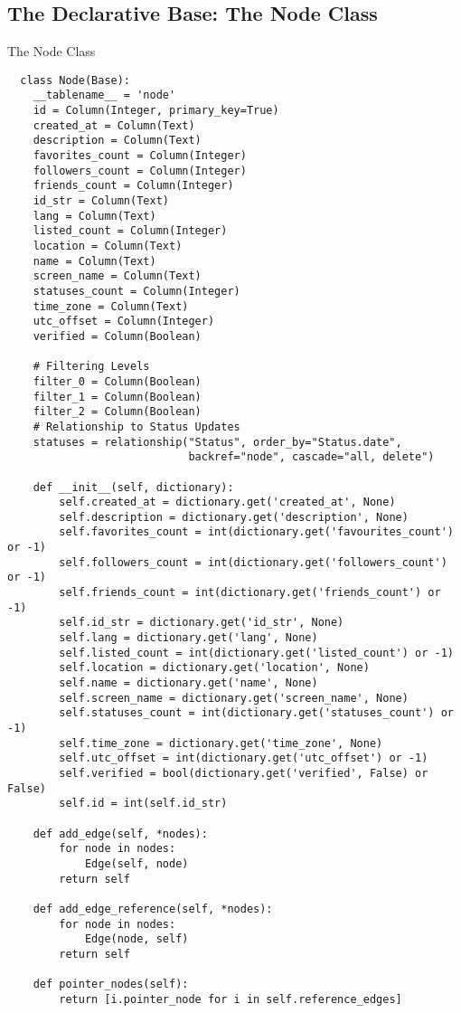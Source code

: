 \subsection{The Declarative Base: The Node Class}
The Node Class
\begin{lstlisting}
  class Node(Base):
    __tablename__ = 'node'
    id = Column(Integer, primary_key=True)
    created_at = Column(Text)
    description = Column(Text)
    favorites_count = Column(Integer)
    followers_count = Column(Integer)
    friends_count = Column(Integer)
    id_str = Column(Text)
    lang = Column(Text)
    listed_count = Column(Integer)
    location = Column(Text)
    name = Column(Text)
    screen_name = Column(Text)
    statuses_count = Column(Integer)
    time_zone = Column(Text)
    utc_offset = Column(Integer)
    verified = Column(Boolean)

    # Filtering Levels
    filter_0 = Column(Boolean)
    filter_1 = Column(Boolean)
    filter_2 = Column(Boolean)
    # Relationship to Status Updates
    statuses = relationship("Status", order_by="Status.date",
                            backref="node", cascade="all, delete")

    def __init__(self, dictionary):
        self.created_at = dictionary.get('created_at', None)
        self.description = dictionary.get('description', None)
        self.favorites_count = int(dictionary.get('favourites_count') or -1)
        self.followers_count = int(dictionary.get('followers_count') or -1)
        self.friends_count = int(dictionary.get('friends_count') or -1)
        self.id_str = dictionary.get('id_str', None)
        self.lang = dictionary.get('lang', None)
        self.listed_count = int(dictionary.get('listed_count') or -1)
        self.location = dictionary.get('location', None)
        self.name = dictionary.get('name', None)
        self.screen_name = dictionary.get('screen_name', None)
        self.statuses_count = int(dictionary.get('statuses_count') or -1)
        self.time_zone = dictionary.get('time_zone', None)
        self.utc_offset = int(dictionary.get('utc_offset') or -1)
        self.verified = bool(dictionary.get('verified', False) or False)
        self.id = int(self.id_str)

    def add_edge(self, *nodes):
        for node in nodes:
            Edge(self, node)
        return self

    def add_edge_reference(self, *nodes):
        for node in nodes:
            Edge(node, self)
        return self

    def pointer_nodes(self):
        return [i.pointer_node for i in self.reference_edges]


\end{lstlisting}
